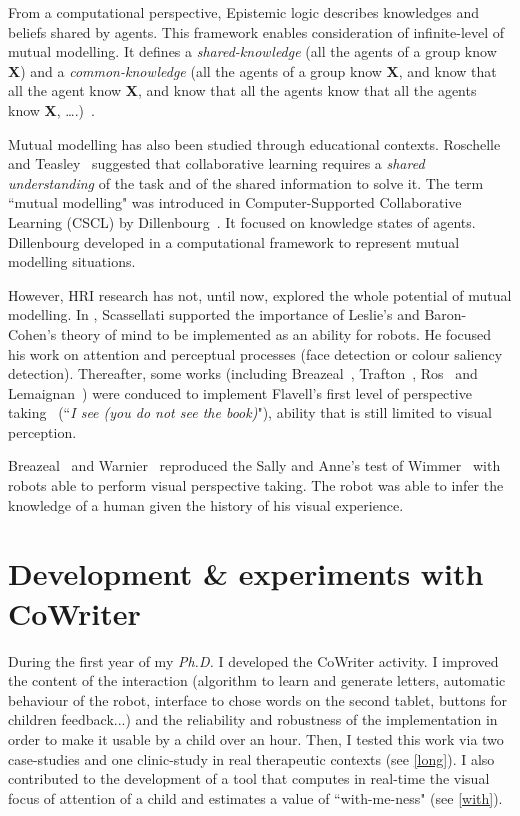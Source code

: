 \documentclass[10pt,a4paper]{article}
\begin{document}
From a computational perspective, Epistemic logic describes knowledges and beliefs shared by agents. This framework enables consideration of infinite-level of mutual modelling. It defines a \textit{shared-knowledge} (all the agents of a group know \textbf{X}) and a \textit{common-knowledge} (all the agents of a group know \textbf{X}, and know that all the agent know \textbf{X}, and know that all the agents know that all the agents know \textbf{X}, \dots.)~\cite{hendricks2008epistemic}. 

Mutual modelling has also been studied through educational contexts. Roschelle and Teasley~\cite{roschelle1995construction} suggested that collaborative learning requires a \textit{shared understanding} of the task and of the shared information to solve it. 
The term ``mutual modelling" was introduced in Computer-Supported Collaborative Learning (CSCL) by Dillenbourg~\cite{dillenbourg1999you}. It focused on knowledge states of agents. Dillenbourg developed in \cite{sangin2007partner} a computational framework to represent mutual modelling situations.

However, HRI research has not, until now, explored the whole potential of mutual modelling. In \cite{scassellati2002theory}, Scassellati supported the importance of Leslie's and Baron-Cohen's theory of mind to be implemented as an ability for robots. 
He focused his work on attention and perceptual processes (face detection or colour saliency detection). Thereafter, some works (including Breazeal~\cite{breazeal2006using}, Trafton~\cite{Trafton2005}, Ros~\cite{Ros2010} and Lemaignan~\cite{lemaignan2012thesis}) were conduced to implement Flavell's first level of perspective taking~\cite{flavell1977development} (``\textit{I see (you do not see the book)}"), ability that is still limited to visual perception. 

Breazeal~\cite{breazeal2009embodied} and Warnier~\cite{warnier2012when} reproduced the Sally and Anne's test of Wimmer~\cite{wimmer1983beliefs} with robots able to perform visual perspective taking. The robot was able to infer the knowledge of a human given the history of his visual experience.



\section{Development \& experiments with CoWriter}\label{year}
During the first year of my \textit{Ph.D.} I developed the CoWriter activity. I improved the content of the interaction (algorithm to learn and generate letters, automatic behaviour of the robot, interface to chose words on the second tablet, buttons for children feedback...) and the reliability and robustness of the implementation in order to make it usable by a child over an hour. Then, I tested this work via two case-studies and one clinic-study in real therapeutic contexts (see \ref{long}). I also contributed to the development of a tool that computes in real-time the visual focus of attention of a child and estimates a value of ``with-me-ness" (see \ref{with}).
\end{document}
